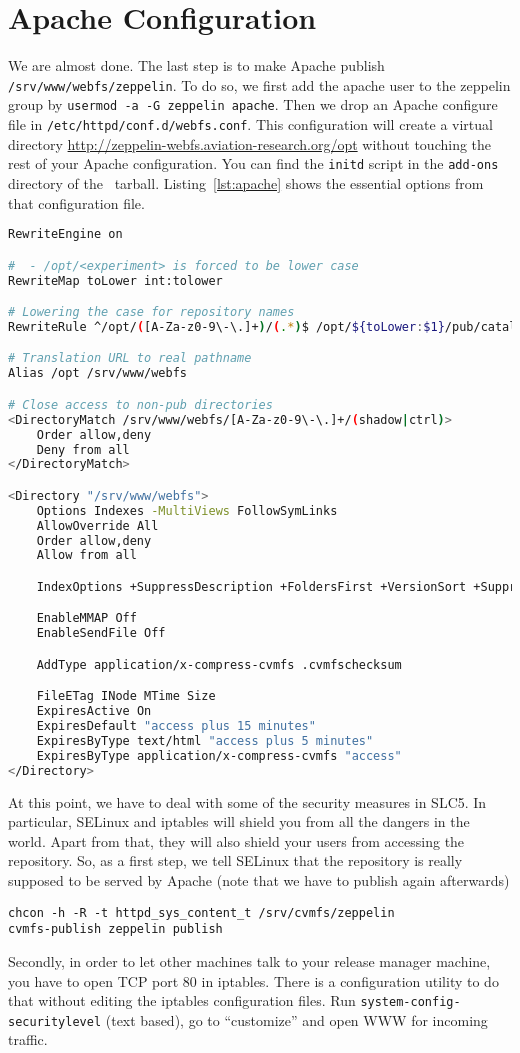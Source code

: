 \section{Apache Configuration}
We are almost done.
The last step is to make Apache publish \texttt{/srv/www/webfs/zeppelin}.
To do so, we first add the apache user to the zeppelin group by \lstinline{usermod -a -G zeppelin apache}.
Then we drop an Apache configure file in \texttt{/etc/httpd/conf.d/webfs.conf}.
This configuration will create a virtual directory \url{http://zeppelin-webfs.aviation-research.org/opt} without touching the rest of your Apache configuration.
You can find the \texttt{initd} script in the \texttt{add-ons} directory of the \cvmfs\ tarball.
Listing~\ref{lst:apache} shows the essential options from that configuration file.
\begin{lstlisting}[caption=Excerpt from \texttt{webfs.conf} Apache configuration,label= lst:apache,language=bash]
RewriteEngine on

#  - /opt/<experiment> is forced to be lower case 
RewriteMap toLower int:tolower

# Lowering the case for repository names
RewriteRule ^/opt/([A-Za-z0-9\-\.]+)/(.*)$ /opt/${toLower:$1}/pub/catalogs/$2 [PT] 

# Translation URL to real pathname
Alias /opt /srv/www/webfs

# Close access to non-pub directories
<DirectoryMatch /srv/www/webfs/[A-Za-z0-9\-\.]+/(shadow|ctrl)>
    Order allow,deny
    Deny from all
</DirectoryMatch>

<Directory "/srv/www/webfs">
    Options Indexes -MultiViews FollowSymLinks
    AllowOverride All
    Order allow,deny
    Allow from all

    IndexOptions +SuppressDescription +FoldersFirst +VersionSort +SuppressIcon

    EnableMMAP Off
    EnableSendFile Off

    AddType application/x-compress-cvmfs .cvmfschecksum

    FileETag INode MTime Size 
    ExpiresActive On
    ExpiresDefault "access plus 15 minutes"
    ExpiresByType text/html "access plus 5 minutes" 
    ExpiresByType application/x-compress-cvmfs "access" 
</Directory>
\end{lstlisting}

At this point, we have to deal with some of the security measures in SLC5.
In particular, SELinux and iptables will shield you from all the dangers in the world.
Apart from that, they will also shield your users from accessing the repository.
So, as a first step, we tell SELinux that the repository is really supposed to be served by Apache (note that we have to publish again afterwards)
\begin{lstlisting}
chcon -h -R -t httpd_sys_content_t /srv/cvmfs/zeppelin
cvmfs-publish zeppelin publish
\end{lstlisting}
Secondly, in order to let other machines talk to your release manager machine, you have to open TCP port 80 in iptables.
There is a configuration utility to do that without editing the iptables configuration files.
Run \lstinline{system-config-securitylevel} (text based), go to ``customize'' and open WWW for incoming traffic.

